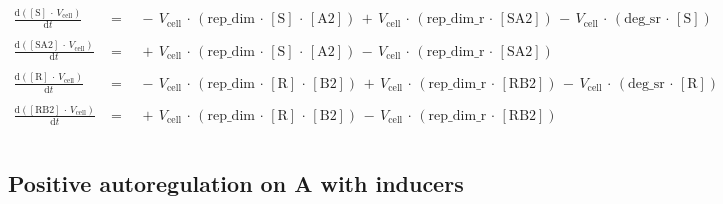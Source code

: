  $$
 \begin{array}{ccl}
 \frac {\mathrm{d}\left( {{\mathrm{[S]}} \, \cdot \, {V}_{\mathrm{cell}} } \right) }  {\mathrm{d}{t} }  \; &=& \;  { \, - \, {V}_{\mathrm{cell}} \, \cdot \, \left( {{\mathrm{rep\_dim}} \, \cdot \, {\mathrm{[S]}} \, \cdot \, {\mathrm{[A2]}} } \right) }{ \, + \, {V}_{\mathrm{cell}} \, \cdot \, \left( {{\mathrm{rep\_dim\_r}} \, \cdot \, {\mathrm{[SA2]}} } \right) }{ \, - \, {V}_{\mathrm{cell}} \, \cdot \, \left( {{\mathrm{deg\_sr}} \, \cdot \, {\mathrm{[S]}} } \right) } \\ 
 && \\ 
 
 
\frac {\mathrm{d}\left( {{\mathrm{[SA2]}} \, \cdot \, {V}_{\mathrm{cell}} } \right) }  {\mathrm{d}{t} }  \; &=& \;  { \, + \, {V}_{\mathrm{cell}} \, \cdot \, \left( {{\mathrm{rep\_dim}} \, \cdot \, {\mathrm{[S]}} \, \cdot \, {\mathrm{[A2]}} } \right) }{ \, - \, {V}_{\mathrm{cell}} \, \cdot \, \left( {{\mathrm{rep\_dim\_r}} \, \cdot \, {\mathrm{[SA2]}} } \right) } \\ 
 && \\ 
 
 
\frac {\mathrm{d}\left( {{\mathrm{[R]}} \, \cdot \, {V}_{\mathrm{cell}} } \right) }  {\mathrm{d}{t} }  \; &=& \;  { \, - \, {V}_{\mathrm{cell}} \, \cdot \, \left( {{\mathrm{rep\_dim}} \, \cdot \, {\mathrm{[R]}} \, \cdot \, {\mathrm{[B2]}} } \right) }{ \, + \, {V}_{\mathrm{cell}} \, \cdot \, \left( {{\mathrm{rep\_dim\_r}} \, \cdot \, {\mathrm{[RB2]}} } \right) }{ \, - \, {V}_{\mathrm{cell}} \, \cdot \, \left( {{\mathrm{deg\_sr}} \, \cdot \, {\mathrm{[R]}} } \right) } \\ 
 && \\ 
 
 
\frac {\mathrm{d}\left( {{\mathrm{[RB2]}} \, \cdot \, {V}_{\mathrm{cell}} } \right) }  {\mathrm{d}{t} }  \; &=& \;  { \, + \, {V}_{\mathrm{cell}} \, \cdot \, \left( {{\mathrm{rep\_dim}} \, \cdot \, {\mathrm{[R]}} \, \cdot \, {\mathrm{[B2]}} } \right) } { \, - \, {V}_{\mathrm{cell}} \, \cdot \, \left( {{\mathrm{rep\_dim\_r}} \, \cdot \, {\mathrm{[RB2]}} } \right) } \\ 
 && \\ 
\end{array}
$$
\subsection*{Positive autoregulation on A with inducers}

